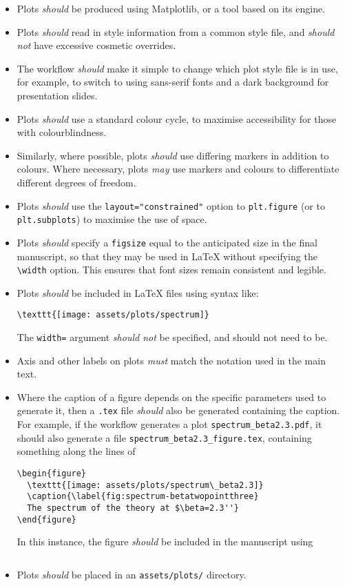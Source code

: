 \documentclass{article}
\newcommand\rfcword[1]{\emph{#1}\xspace}
\newcommand\must{\rfcword{must}}
\newcommand\should{\rfcword{should}}
\newcommand\shouldnot{\rfcword{should not}}
\newcommand\may{\rfcword{may}}
\newcommand\filename[1]{\texttt{#1}\xspace}
\begin{document}
\begin{itemize}
  \item
        Plots \should be produced using Matplotlib,
        or a tool based on its engine.
  \item
        Plots \should read in style information from a common style file,
        and \shouldnot have excessive cosmetic overrides.
  \item
        The workflow \should make it simple to change which plot style file is in use,
        for example,
        to switch to using sans-serif fonts and a dark background
        for presentation slides.
  \item
        Plots \should use a standard colour cycle,
        to maximise accessibility for those with colourblindness.
  \item
        Similarly,
        where possible,
        plots \should use differing markers in addition to colours.
        Where necessary,
        plots \may use markers and colours to differentiate different degrees of freedom.
  \item
        Plots \should use the \verb|layout="constrained"| option to \verb|plt.figure|
        (or to \verb|plt.subplots|)
        to maximise the use of space.
  \item
        Plots \should specify a \verb|figsize|
        equal to the anticipated size in the final manuscript,
        so that they may be used in LaTeX without specifying the \verb|\width| option.
        This ensures that font sizes remain consistent and legible.
  \item
        Plots \should be included in LaTeX files using syntax like:
\begin{verbatim}
\texttt{[image: assets/plots/spectrum]}
\end{verbatim}
        The \texttt{width=} argument \shouldnot be specified,
        and should not need to be.
  \item
        Axis and other labels on plots \must match the notation used in the main text.
  \item
        Where the caption of a figure depends on the specific parameters used to generate it,
        then a \filename{.tex} file \should also be generated containing the caption.
        For example,
        if the workflow generates a plot \filename{spectrum\_beta2.3.pdf},
        it should also generate a file \filename{spectrum\_beta2.3\_figure.tex},
        containing something along the lines of
\begin{verbatim}
\begin{figure}
  \texttt{[image: assets/plots/spectrum\_beta2.3]}
  \caption{\label{fig:spectrum-betatwopointthree}
  The spectrum of the theory at $\beta=2.3''}
\end{figure}
\end{verbatim}
        In this instance,
        the figure \should be included in the manuscript using
\begin{verbatim}

\end{verbatim}
  \item
        Plots \should be placed in an \filename{assets/plots/} directory.
\end{itemize}
\end{document}
